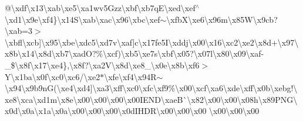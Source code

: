 \begin{DoxyCompactItemize}
@\textbackslash{}xdf\textbackslash{}x13\textbackslash{}xab\textbackslash{}xe5\textbackslash{}xa1wv5\+Gzz\textbackslash{}xbf\textbackslash{}xb7q\+E\textbackslash{}xed\textbackslash{}xef$^\wedge$\textbackslash{}xd1\textbackslash{}x9e\textbackslash{}xf4\}\textbackslash{}x14\+S\textbackslash{}xab\textbackslash{}xac\textbackslash{}x96\textbackslash{}xbc\textbackslash{}xef$\sim$\textbackslash{}xfb\+X\textbackslash{}xe6\textbackslash{}x96m\textbackslash{}x85\+W\textbackslash{}x9cb?\textbackslash{}xab=3$>$\textbackslash{}xbfl\textbackslash{}xcb\mbox{]}\textbackslash{}x95\textbackslash{}xbe\textbackslash{}xdc5\textbackslash{}xd7v\textbackslash{}xaf\mbox{]}c\textbackslash{}x17fe5\+I\textbackslash{}xddj\textbackslash{}x00\textbackslash{}x16\textbackslash{}xc2\textbackslash{}xe2\textbackslash{}x8d+\textbackslash{}x97\textbackslash{}x8b\textbackslash{}x14\textbackslash{}x8d\textbackslash{}xb7\textbackslash{}xad\+O?\%\textbackslash{}xcf)\textbackslash{}xb5\textbackslash{}xe7s\textbackslash{}xbf\textbackslash{}x05?\textbackslash{}x07l\textbackslash{}x80\textbackslash{}x09\textbackslash{}xaf-\/\+\_\+\$\textbackslash{}x8f\textbackslash{}x17\textbackslash{}xe4\},\textbackslash{}x8f?\textbackslash{}xa2\+V\textbackslash{}x8d\textbackslash{}xe8\+\_\+\textbackslash{}x0e\textbackslash{}x8b\textbackslash{}xf6$>$\+Y\textquotesingle{}\textbackslash{}x1ba\textbackslash{}x0f\textbackslash{}xc0\textbackslash{}xc6/\textbackslash{}xe2$\ast$\textbackslash{}xfe\textbackslash{}xf4\textbackslash{}x94\+R$\sim$\textbackslash{}x94\textbackslash{}x9b9n\+G(\textbackslash{}xe4\textbackslash{}xd4\mbox{]}\textbackslash{}xa3\textbackslash{}xff\textbackslash{}xc0\textbackslash{}xfc\textbackslash{}xf9\%\textbackslash{}x00\textbackslash{}xcf\textbackslash{}xa6\textbackslash{}xde\textbackslash{}xff\textbackslash{}x0b\textbackslash{}xebg!\textbackslash{}xe8\textbackslash{}xca\textbackslash{}xd1m\textbackslash{}x8e\textbackslash{}x00\textbackslash{}x00\textbackslash{}x00\textbackslash{}x00\+I\+E\+N\+D\textbackslash{}xae\+B\`{}\textbackslash{}x82\textbackslash{}x00\textbackslash{}x00\textbackslash{}x08h\textbackslash{}x89\+P\+N\+G\textbackslash{}x0d\textbackslash{}x0a\textbackslash{}x1a\textbackslash{}x0a\textbackslash{}x00\textbackslash{}x00\textbackslash{}x00\textbackslash{}x0d\+I\+H\+D\+R\textbackslash{}x00\textbackslash{}x00\textbackslash{}x00 \textbackslash{}x00\textbackslash{}x00\textbackslash{}x00 
\end{DoxyCompactItemize}
